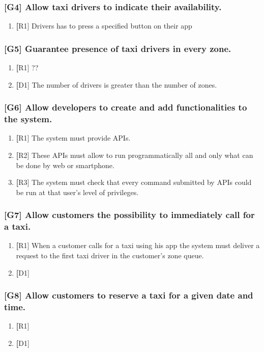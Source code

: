 \subsubsection{[G4] Allow taxi drivers to indicate their availability.}
	\begin{enumerate}
	\item \textbf [R1] Drivers has to press a specified button on their app
	\end{enumerate}

\subsubsection{[G5] Guarantee presence of taxi drivers in every zone.}
	\begin{enumerate}
	\item \textbf [R1] ??
	\item \textbf [D1] The number of drivers is greater than the number of zones.
	\end{enumerate}
	
\subsubsection{[G6] Allow developers to create and add functionalities to the system.}
	\begin{enumerate}
	\item \textbf [R1] The system must provide APIs.
	\item \textbf [R2] These APIs must allow to run programmatically all and only what can be done by web or smartphone.
	\item \textbf [R3] The system must check that every command submitted by APIs could be run at that user's level of privileges.
	\end{enumerate}
	
\subsubsection{[G7] Allow customers the possibility to immediately call for a taxi.}
	\begin{enumerate}
	\item \textbf [R1] When a customer calls for a taxi using his app the system must deliver a request to the first taxi driver in the customer's zone queue.
	\item \textbf [D1] 
	\end{enumerate}

\subsubsection{[G8] Allow customers to reserve a taxi for a given date and time.}
	\begin{enumerate}
	\item \textbf [R1]
	\item \textbf [D1] 
	\end{enumerate}


